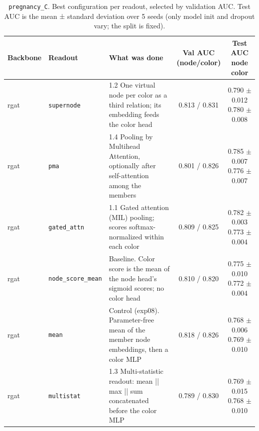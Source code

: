\begin{table}[t]
\centering
\small
\begin{tabularx}{\textwidth}{llXcc}
\toprule
Backbone & Readout & What was done & \makecell{Val AUC\\(node/color)} & \makecell{Test AUC\\node\\color} \\
\midrule
rgat & \texttt{supernode} & 1.2 One virtual node per color as a third relation; its embedding feeds the color head & 0.813 / 0.831 & \makecell{0.790 $\pm$ 0.012\\0.780 $\pm$ 0.008} \\
rgat & \texttt{pma} & 1.4 Pooling by Multihead Attention, optionally after self-attention among the members & 0.801 / 0.826 & \makecell{0.785 $\pm$ 0.007\\0.776 $\pm$ 0.007} \\
rgat & \texttt{gated\_attn} & 1.1 Gated attention (MIL) pooling; scores softmax-normalized within each color & 0.809 / 0.825 & \makecell{0.782 $\pm$ 0.003\\0.773 $\pm$ 0.004} \\
rgat & \texttt{node\_score\_mean} & Baseline. Color score is the mean of the node head's sigmoid scores; no color head & 0.810 / 0.820 & \makecell{0.775 $\pm$ 0.010\\0.772 $\pm$ 0.004} \\
rgat & \texttt{mean} & Control (exp08). Parameter-free mean of the member node embeddings, then a color MLP & 0.818 / 0.826 & \makecell{0.768 $\pm$ 0.006\\0.769 $\pm$ 0.010} \\
rgat & \texttt{multistat} & 1.3 Multi-statistic readout: mean || max || sum concatenated before the color MLP & 0.789 / 0.830 & \makecell{0.769 $\pm$ 0.015\\0.768 $\pm$ 0.010} \\
\bottomrule
\end{tabularx}
\caption{\texttt{pregnancy\_C}. Best configuration per readout, selected by validation AUC. Test AUC is the mean ± standard deviation over 5 seeds (only model init and dropout vary; the split is fixed).}
\label{tab:exp09-pooling}
\end{table}
